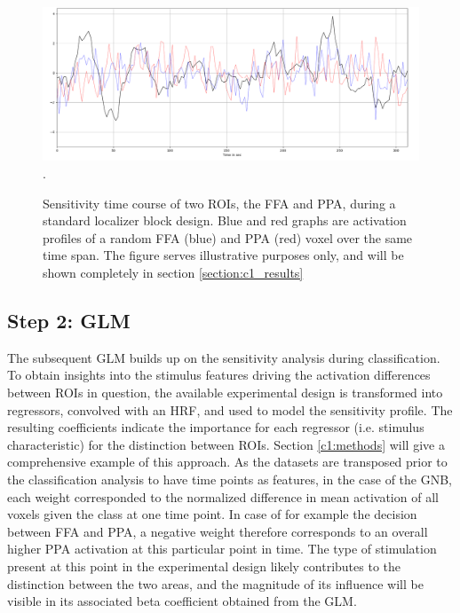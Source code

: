 \documentclass[a4paper, 12pt]{scrreprt}
\begin{document}
\begin{figure}[H]
	\includegraphics[scale = 0.37]{img/tc_loc_plusvox_v2.png}.
	\caption[Examplary time course of sensitivities]{\small{Sensitivity time course of two ROIs, the FFA and PPA, during a standard localizer block design. Blue and red graphs are activation profiles of a random FFA (blue) and PPA (red) voxel over the same time span. The figure serves illustrative purposes only, and will be shown completely in section \ref{section:c1_results}}}
	\label{fig:tc}
\end{figure}

\subsection{Step 2: GLM}

The subsequent GLM builds up on the sensitivity analysis during classification. To obtain insights into the stimulus features driving the activation differences between ROIs in question, the available experimental design is transformed into regressors, convolved with an HRF, and used to model the sensitivity profile. The resulting coefficients indicate the importance for each regressor (i.e. stimulus characteristic) for the distinction between ROIs. Section \ref{c1:methods} will give a comprehensive example of this approach. As the datasets are transposed prior to the classification analysis to have time points as features, in the case of the GNB, each weight corresponded to the normalized difference in mean activation of all voxels given the class at one time point. In case of for example the decision between FFA and PPA, a negative weight therefore corresponds to an overall higher PPA activation at this particular point in time. The type of stimulation present at this point in the experimental design likely contributes to the distinction between the two areas, and the magnitude of its influence will be visible in its associated beta coefficient obtained from the GLM.
	
\end{document}
